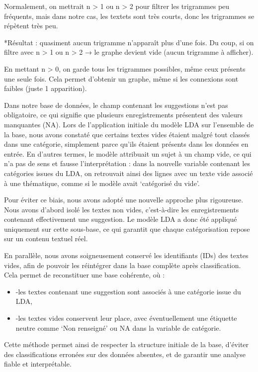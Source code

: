 \documentclass[
]{article}
\begin{document}
Normalement, on mettrait n \textgreater{} 1 ou n \textgreater{} 2 pour
filtrer les trigrammes peu fréquents, mais dans notre cas, les textets
sont très courts, donc les trigrammes se répètent très peu.

*Résultat : quasiment aucun trigramme n'apparaît plus d'une fois. Du
coup, si on filtre avec n \textgreater{} 1 ou n \textgreater{} 2 → le
graphe devient vide (aucun trigramme à afficher).

En mettant n \textgreater{} 0, on garde tous les trigrammes possibles,
même ceux présents une seule fois. Cela permet d'obtenir un graphe, même
si les connexions sont faibles (juste 1 apparition).

Dans notre base de données, le champ contenant les suggestions n'est pas
obligatoire, ce qui signifie que plusieurs enregistrements présentent
des valeurs manquantes (NA). Lors de l'application initiale du modèle
LDA sur l'ensemble de la base, nous avons constaté que certains textes
vides étaient malgré tout classés dans une catégorie, simplement parce
qu'ils étaient présents dans les données en entrée. En d'autres termes,
le modèle attribuait un sujet à un champ vide, ce qui n'a pas de sens et
fausse l'interprétation : dans la nouvelle variable contenant les
catégories issues du LDA, on retrouvait ainsi des lignes avec un texte
vide associé à une thématique, comme si le modèle avait `catégorisé du
vide'.

Pour éviter ce biais, nous avons adopté une nouvelle approche plus
rigoureuse. Nous avons d'abord isolé les textes non vides, c'est-à-dire
les enregistrements contenant effectivement une suggestion. Le modèle
LDA a donc été appliqué uniquement sur cette sous-base, ce qui garantit
que chaque catégorisation repose sur un contenu textuel réel.

En parallèle, nous avons soigneusement conservé les identifiants (IDs)
des textes vides, afin de pouvoir les réintégrer dans la base complète
après classification. Cela permet de reconstituer une base cohérente, où
:

\begin{itemize}
\item
  -les textes contenant une suggestion sont associés à une catégorie
  issue du LDA,
\item
  -les textes vides conservent leur place, avec éventuellement une
  étiquette neutre comme `Non renseigné' ou NA dans la variable de
  catégorie.
\end{itemize}

Cette méthode permet ainsi de respecter la structure initiale de la
base, d'éviter des classifications erronées sur des données absentes, et
de garantir une analyse fiable et interprétable.
\end{document}
